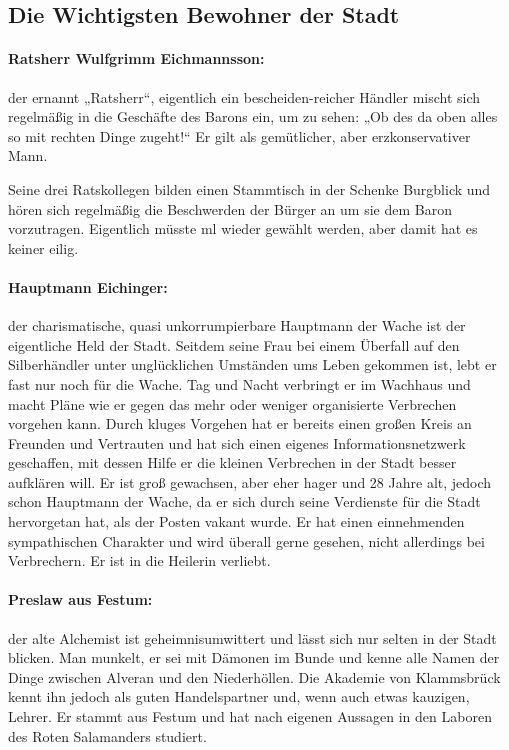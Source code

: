 \subsection{Die Wichtigsten Bewohner der Stadt}
\paragraph{Ratsherr Wulfgrimm Eichmannsson:} der ernannt „Ratsherr“, eigentlich ein bescheiden-reicher Händler mischt sich regelmäßig in die Geschäfte des Barons ein, um zu sehen: „Ob des da oben alles so mit rechten Dinge zugeht!“ Er gilt als gemütlicher, aber erzkonservativer Mann.

Seine drei Ratskollegen bilden einen Stammtisch in der Schenke Burgblick und hören sich regelmäßig die Beschwerden der Bürger an um sie dem Baron vorzutragen. Eigentlich müsste ml wieder gewählt werden, aber damit hat es keiner eilig.

\paragraph{Hauptmann Eichinger:} der charismatische, quasi unkorrumpierbare Hauptmann der Wache ist der eigentliche Held der Stadt. Seitdem seine Frau bei einem Überfall auf den Silberhändler unter unglücklichen Umständen ums Leben gekommen ist, lebt er fast nur noch für die Wache. Tag und Nacht verbringt er im Wachhaus und macht Pläne wie er gegen das mehr oder weniger organisierte Verbrechen vorgehen kann. Durch kluges Vorgehen hat er bereits einen großen Kreis an Freunden und Vertrauten und hat sich einen eigenes Informationsnetzwerk geschaffen, mit dessen Hilfe er die kleinen Verbrechen in der Stadt besser aufklären will. Er ist groß gewachsen, aber eher hager und 28 Jahre alt, jedoch schon Hauptmann der Wache, da er sich durch seine Verdienste für die Stadt hervorgetan hat, als der Posten vakant wurde. Er hat einen einnehmenden sympathischen Charakter und wird überall gerne gesehen, nicht allerdings bei Verbrechern. Er ist in die Heilerin verliebt.

\paragraph{Preslaw aus Festum:} der alte Alchemist ist geheimnisumwittert und lässt sich nur selten in der Stadt blicken. Man munkelt, er sei mit Dämonen im Bunde und kenne alle Namen der Dinge zwischen Alveran und den Niederhöllen. Die Akademie von Klammsbrück kennt ihn jedoch als guten Handelspartner und, wenn auch etwas kauzigen, Lehrer. Er stammt aus Festum und hat nach eigenen Aussagen in den Laboren des Roten Salamanders studiert.

